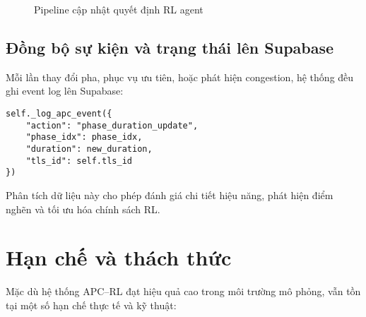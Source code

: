 \begin{figure}[H]
    \centering
    \caption{Pipeline cập nhật quyết định RL agent}
    \label{fig:rl_decision_pipeline}
\end{figure}

\subsection{Đồng bộ sự kiện và trạng thái lên Supabase}

Mỗi lần thay đổi pha, phục vụ ưu tiên, hoặc phát hiện congestion, hệ thống đều ghi event log lên Supabase:

\begin{lstlisting}[style=py,caption={Ghi log sự kiện lên Supabase}]
self._log_apc_event({
    "action": "phase_duration_update",
    "phase_idx": phase_idx,
    "duration": new_duration,
    "tls_id": self.tls_id
})
\end{lstlisting}

Phân tích dữ liệu này cho phép đánh giá chi tiết hiệu năng, phát hiện điểm nghẽn và tối ưu hóa chính sách RL.

\section{Hạn chế và thách thức}

Mặc dù hệ thống APC–RL đạt hiệu quả cao trong môi trường mô phỏng, vẫn tồn tại một số hạn chế thực tế và kỹ thuật:

